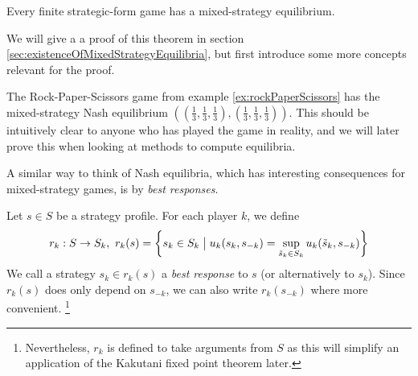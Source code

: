 \documentclass[a4paper]{scrreprt}
\begin{document}
    
    \begin{thm}
        Every finite strategic-form game has a mixed-strategy equilibrium. \cite{bib:fudenbergGameTheory}
        \label{thm:existenceOfMixedStrategyEquilibria}
    \end{thm}
    We will give a a proof of this theorem in section \ref{sec:existenceOfMixedStrategyEquilibria}, but first introduce some more concepts relevant for the proof.
    
    \begin{ex} %
        The Rock-Paper-Scissors game from example \ref{ex:rockPaperScissors}
        has the mixed-strategy Nash equilibrium $((\frac{1}{3}, \frac{1}{3}, \frac{1}{3}), (\frac{1}{3}, \frac{1}{3}, \frac{1}{3}))$.
        This should be intuitively clear to anyone who has played the game in reality, and we will later prove this when looking at methods to compute equilibria.
    \end{ex}
    
    A similar way to think of Nash equilibria, which has interesting consequences for mixed-strategy games, is by \emph{best responses}.
    
    \begin{defn}
        Let $s \in S$ be a strategy profile. For each player $k$, we define 
        \[
            r_k: S \to S_k,~ r_k(s) = \biggl\{s_k \in S_k \bigm\vert u_k(s_k, s_{-k}) = \sup_{\tilde{s}_k \in S_k} u_k(\tilde{s}_k, s_{-k}) \biggr\}
        \]
        We call a strategy $s_k \in r_k(s)$ a \emph{best response} to $s$ (or alternatively to $s_k$).
        Since $r_k(s)$ does only depend on $s_{-k}$, we can also write $r_k(s_{-k})$ where more convenient. %
        \footnote{Nevertheless, $r_k$ is defined to take arguments from $S$ as this will simplify an application of the Kakutani fixed point theorem later. %
        }
    \end{defn}
    
\end{document}
